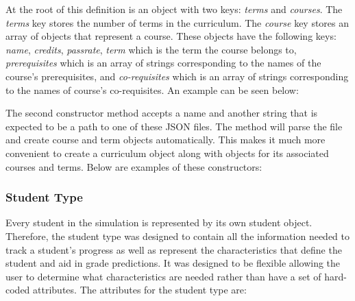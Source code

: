 \documentclass[botnum, fleqn]{unmeethesis}
\begin{document}
      At the root of this definition is an object with two keys: \textit{terms} and \textit{courses}. The \textit{terms} key stores the number of terms in the curriculum. The \textit{course} key stores an array of objects that represent a course. These objects have the following keys: \textit{name}, \textit{credits}, \textit{passrate}, \textit{term} which is the term the course belongs to, \textit{prerequisites} which is an array of strings corresponding to the names of the course's prerequisites, and \textit{co-requisites} which is an array of strings corresponding to the names of course's co-requisites. An example can be seen below:

      

      The second constructor method accepts a name and another string that is expected to be a path to one of these JSON files. The method will parse the file and create course and term objects automatically. This makes it much more convenient to create a curriculum object along with objects for its associated courses and terms. Below are examples of these constructors:

      

    \subsubsection{Student Type}
      Every student in the simulation is represented by its own student object. Therefore, the student type was designed to contain all the information needed to track a student's progress as well as represent the characteristics that define the student and aid in grade predictions. It was designed to be flexible allowing the user to determine what characteristics are needed rather than have a set of hard-coded attributes. The attributes for the student type are:
\end{document}
